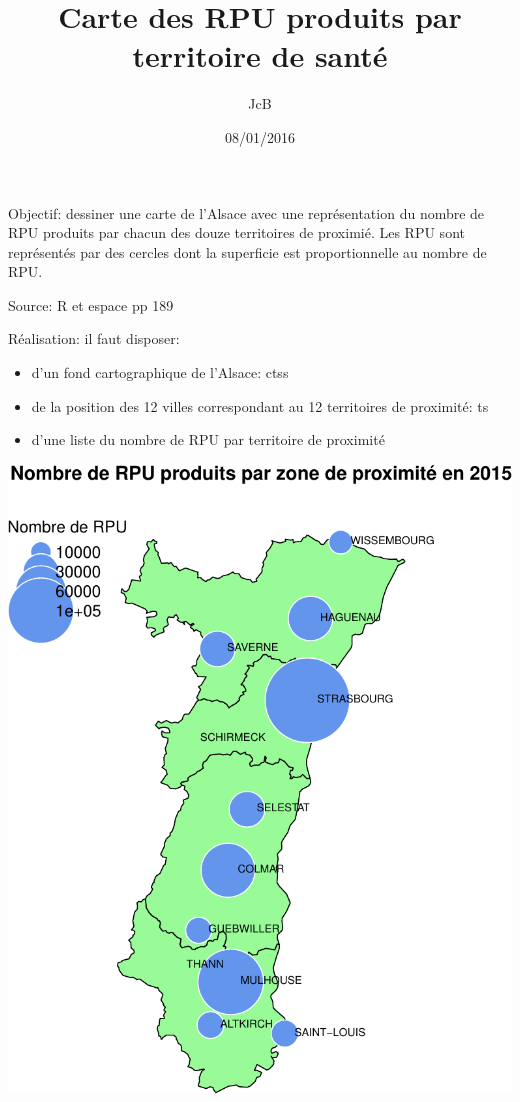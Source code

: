 \documentclass[]{article}
\title{Carte des RPU produits par territoire de santé}
\author{JcB}
\date{08/01/2016}
\begin{document}
\maketitle


Objectif: dessiner une carte de l'Alsace avec une représentation du
nombre de RPU produits par chacun des douze territoires de proximié. Les
RPU sont représentés par des cercles dont la superficie est
proportionnelle au nombre de RPU.

Source: R et espace pp 189

Réalisation: il faut disposer:

\begin{itemize}
\itemsep1pt\parskip0pt
\item
  d'un fond cartographique de l'Alsace: ctss
\item
  de la position des 12 villes correspondant au 12 territoires de
  proximité: ts
\item
  d'une liste du nombre de RPU par territoire de proximité
\end{itemize}

\includegraphics{carte_rpu_tp_files/figure-latex/carte-1.pdf}
\end{document}
